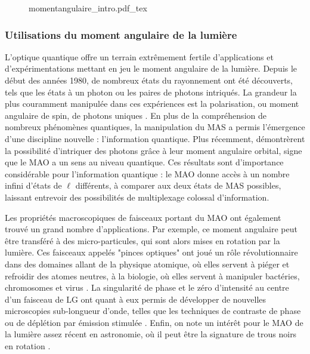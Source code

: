 \begin{figure}[!ht]
\centering
\def\svgwidth{\columnwidth}
{momentangulaire_intro.pdf_tex}
\label{Fig:Intro_MA}
\end{figure}

\subsubsection{Utilisations du moment angulaire de la lumière}
L'optique quantique offre un terrain extrêmement fertile d'applications et d'expérimentations mettant en jeu le moment angulaire de la lumière. Depuis le début des années 1980, de nombreux états du rayonnement ont été découverts, tels que les états à un photon ou les paires de photons intriqués. La grandeur la plus couramment manipulée dans ces expériences est la polarisation, ou moment angulaire de spin, de photons uniques . En plus de la compréhension de nombreux phénomènes quantiques, la manipulation du MAS a permis l'émergence d'une discipline nouvelle : l'information quantique. Plus récemment,  démontrèrent la possibilité d'intriquer des photons grâce à leur moment angulaire orbital, signe que le MAO a un sens au niveau quantique. Ces résultats sont d'importance considérable pour l'information quantique  : le MAO donne accès à un nombre infini d'états de $\ell$ différents, à comparer aux deux états de MAS possibles, laissant entrevoir des possibilités de multiplexage colossal d'information.

Les propriétés macroscopiques de faisceaux portant du MAO ont également trouvé un grand nombre d'applications. Par exemple, ce moment angulaire peut être transféré à des micro-particules, qui sont alors mises en rotation par la lumière. Ces faisceaux appelés "pinces optiques" ont joué un rôle révolutionnaire dans des domaines allant de la physique atomique, où elles servent à piéger et refroidir des atomes neutres, à la biologie, où elles servent à manipuler bactéries, chromosomes et virus . La singularité de phase et le zéro d'intensité au centre d'un faisceau de LG ont quant à eux permis de développer de nouvelles microscopies sub-longueur d'onde, telles que les techniques de contraste de phase  ou de déplétion par émission stimulée . Enfin, on note un intérêt pour le MAO de la lumière assez récent en astronomie, où il peut être la signature de trous noirs en rotation .

